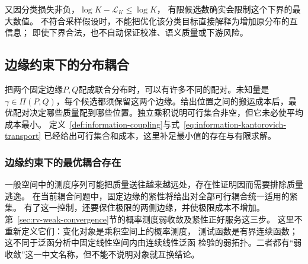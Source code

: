 又因分类损失非负，\(\log K-\mathcal L_K\leq\log K\)，
有限候选数确实会限制这个下界的最大数值。
不符合采样假设时，不能把优化该分类目标直接解释为增加原分布的互信息；
即使下界合法，也不自动保证校准、语义质量或下游风险。

\subsection{边缘约束下的分布耦合}
\label{sec:information-coupling-optimization}

把两个固定边缘\(P,Q\)配成联合分布时，可以有许多不同的配对。未知量是
\(\gamma\in\Pi(P,Q)\)，每个候选都须保留这两个边缘。给出位置之间的搬运成本后，最优配对决定哪些质量配到哪些位置。独立乘积说明可行集合非空，但它未必使平均成本最小。
定义~\ref{def:information-coupling}与式~\eqref{eq:information-kantorovich-transport}
已经给出可行集合和成本，这里补足最小值的存在与有限求解。

\subsubsection{边缘约束下的最优耦合存在}
\label{sec:information-optimal-coupling-existence}

一般空间中的测度序列可能把质量送往越来越远处，存在性证明因而需要排除质量逃逸。
在当前耦合问题中，固定边缘的紧性将给出对全部可行耦合统一适用的紧集。
有了这一控制，还要保住极限的两侧边缘，并使极限成本不增加。
第~\ref{sec:rv-weak-convergence}节的概率测度弱收敛及紧性正好服务这三步。
这里不重新定义它们：变化对象是乘积空间上的概率测度，
测试函数是有界连续函数；这不同于泛函分析中固定线性空间内由连续线性泛函
检验的弱拓扑。二者都有“弱收敛”这一中文名称，但不能不说明对象就互换结论。

